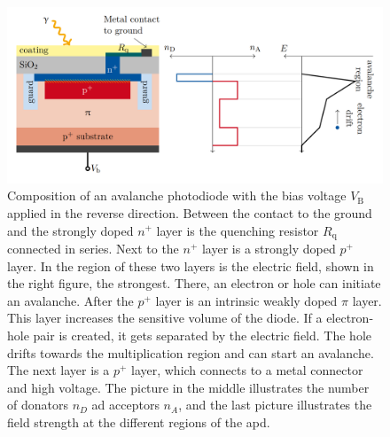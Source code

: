\begin{figure}
	\centering
	\includegraphics[width=1.\textwidth]{pictures/pin_diode}
	\caption[Illustration of a APD.]{Composition of an avalanche photodiode with the bias voltage $V_\text{B}$ applied in the reverse direction. Between the contact to the ground and the strongly doped $n^+$ layer is the quenching resistor $R_\text{q}$ connected in series. Next to the $n^+$ layer is a strongly doped $p^+$ layer. In the region of these two layers is the electric field, shown in the right figure, the strongest. There, an electron or hole can initiate an avalanche. After the $p^+$ layer is an intrinsic weakly doped $\pi$ layer. This layer increases the sensitive volume of the diode. If a electron-hole pair is created, it gets separated by the electric field. The hole drifts towards the multiplication region and can start an avalanche. The next layer is a $p^+$ layer, which connects to a metal connector and high voltage. The picture in the middle illustrates the number of donators $n_D$ ad acceptors $n_A$, and the last picture illustrates the field strength at the different regions of the \ac{apd}. \cite{Kemp:808708}}
	\label{fig:pin_diode}
\end{figure}


